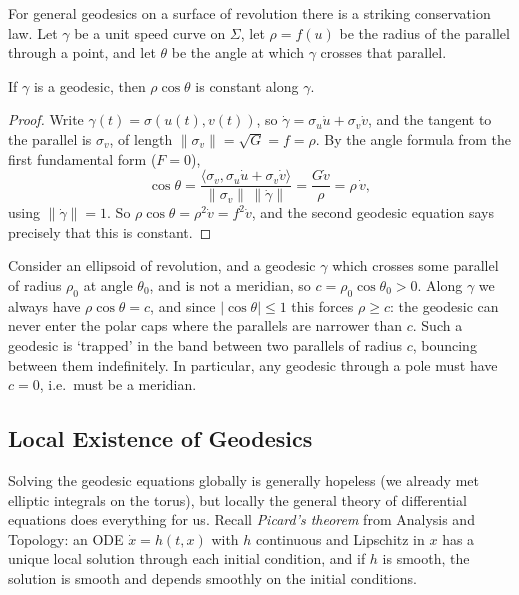 \documentclass[a4paper]{scrartcl}
\begin{document}
For general geodesics on a surface of revolution there is a striking conservation law. Let $\gamma$ be a unit speed curve on $\Sigma$, let $\rho = f(u)$ be the radius of the parallel through a point, and let $\theta$ be the angle at which $\gamma$ crosses that parallel.

\begin{proposition}
    If $\gamma$ is a geodesic, then $\rho \cos \theta$ is constant along $\gamma$.
\end{proposition}
\begin{proof}
    Write $\gamma(t) = \sigma(u(t), v(t))$, so $\dot\gamma = \sigma_u \dot u + \sigma_v \dot v$, and the tangent to the parallel is $\sigma_v$, of length $\|\sigma_v\| = \sqrt{G} = f = \rho$. By the angle formula from the first fundamental form ($F = 0$),
    $$
    \cos\theta = \frac{\langle \sigma_v, \sigma_u \dot u + \sigma_v \dot v\rangle}{\|\sigma_v\| \, \|\dot\gamma\|} = \frac{G \dot v}{\rho} = \rho \, \dot v,
    $$
    using $\|\dot\gamma\| = 1$. So $\rho \cos\theta = \rho^2 \dot v = f^2 \dot v$, and the second geodesic equation says precisely that this is constant.
\end{proof}

\begin{example}
    Consider an ellipsoid of revolution, and a geodesic $\gamma$ which crosses some parallel of radius $\rho_0$ at angle $\theta_0$, and is not a meridian, so $c = \rho_0\cos\theta_0 > 0$. Along $\gamma$ we always have $\rho \cos\theta = c$, and since $|\cos \theta| \leq 1$ this forces $\rho \geq c$: the geodesic can never enter the polar caps where the parallels are narrower than $c$. Such a geodesic is `trapped' in the band between two parallels of radius $c$, bouncing between them indefinitely. In particular, any geodesic through a pole must have $c = 0$, i.e.\ must be a meridian.
\end{example}

\subsection{Local Existence of Geodesics}

Solving the geodesic equations globally is generally hopeless (we already met elliptic integrals on the torus), but locally the general theory of differential equations does everything for us. Recall \emph{Picard's theorem} from Analysis and Topology: an ODE $\dot x = h(t, x)$ with $h$ continuous and Lipschitz in $x$ has a unique local solution through each initial condition, and if $h$ is smooth, the solution is smooth and depends smoothly on the initial conditions.
\end{document}
